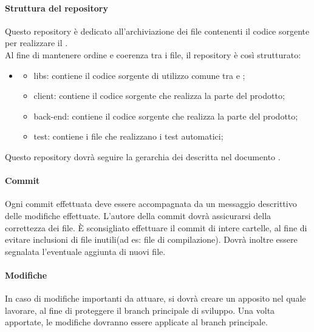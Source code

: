 \paragraph{Struttura del repository \PROGETTO}
Questo repository è dedicato all'archiviazione dei file contenenti il codice sorgente per realizzare il .\\
Al fine di mantenere ordine e coerenza tra i file, il repository è così strutturato:
\begin{itemize}
	\item \PROGETTO
	\begin{itemize}
		\item libs: contiene il codice sorgente di utilizzo comune tra  e ;
		\item client: contiene il codice sorgente che realizza la parte  del prodotto;
		\item back-end: contiene il codice sorgente che realizza la parte  del prodotto;
		\item test: contiene i file che realizzano i test automatici;
	\end{itemize}
\end{itemize}
Questo repository dovrà seguire la gerarchia dei  descritta nel documento \DPdoc.
\paragraph{Commit}
Ogni commit effettuata deve essere accompagnata da un messaggio descrittivo delle modifiche effettuate. L'autore della commit dovrà assicurarsi della correttezza dei file. È sconsigliato effettuare il commit di intere cartelle, al fine di evitare inclusioni di file inutili(ad es: file di compilazione).
Dovrà inoltre essere segnalata l'eventuale aggiunta di nuovi file.
\paragraph{Modifiche}
In caso di modifiche importanti da attuare, si dovrà creare un  apposito nel quale lavorare, al fine di proteggere il branch principale di sviluppo. Una volta apportate, le modifiche dovranno essere applicate al branch principale.
